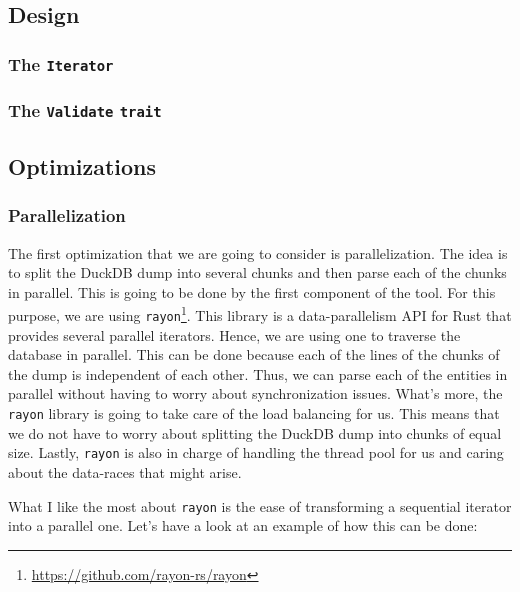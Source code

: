 \begin{pseudocode}
    
\end{pseudocode}

\subsection{Design}

\subsubsection{The \texttt{Iterator}}

\subsubsection{The \texttt{Validate} \texttt{trait}}

\subsection{Optimizations}

\subsubsection{Parallelization}

The first optimization that we are going to consider is parallelization. The idea is to split the DuckDB dump into several chunks and then parse each of the chunks in parallel. This is going to be done by the first component of the tool. For this purpose, we are using \texttt{rayon}\footnote{\url{https://github.com/rayon-rs/rayon}}. This library is a data-parallelism API for Rust that provides several parallel iterators. Hence, we are using one to traverse the database in parallel. This can be done because each of the lines of the chunks of the dump is independent of each other. Thus, we can parse each of the entities in parallel without having to worry about synchronization issues. What's more, the \texttt{rayon} library is going to take care of the load balancing for us. This means that we do not have to worry about splitting the DuckDB dump into chunks of equal size. Lastly, \texttt{rayon} is also in charge of handling the thread pool for us and caring about the data-races that might arise.

What I like the most about \texttt{rayon} is the ease of transforming a sequential iterator into a parallel one. Let's have a look at an example of how this can be done:

